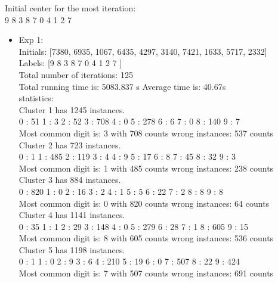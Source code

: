 \documentclass[paper=a4, fontsize=11pt]{scrartcl} %
\numberwithin{equation}{section} %
\numberwithin{figure}{section} %
\numberwithin{table}{section} %
\begin{document}
Initial center for the most iteration:\\
9 8 3 8 7 0 4 1 2 7  \\
\begin{itemize}
	\item Exp 1:  \\
	
	Initials: [7380, 6935, 1067, 6435, 4297, 3140, 7421, 1633, 5717, 2332] \\
	
	Labels: [9 8 3 8 7 0 4 1 2 7 ] \\
	
    Total number of iterations: 125 \\
    
    Total running time is: 5083.837 s Average time is: 40.67s \\
    
    statistics: \\
   Cluster 1 has 1245 instances.\\
0 : 51  1 : 3   2 : 52  3 : 708 4 : 0   5 : 278 6 : 6   7 : 0   8 : 140 9 : 7\\
Most common digit is: 3 with 708 counts wrong instances: 537 counts\\

Cluster 2 has 723 instances.\\
0 : 1   1 : 485 2 : 119 3 : 4   4 : 9   5 : 17  6 : 8   7 : 45  8 : 32  9 : 3\\
Most common digit is: 1 with 485 counts wrong instances: 238 counts\\

Cluster 3 has 884 instances.\\
0 : 820 1 : 0   2 : 16  3 : 2   4 : 1   5 : 5   6 : 22  7 : 2   8 : 8   9 : 8\\
Most common digit is: 0 with 820 counts wrong instances: 64 counts\\

Cluster 4 has 1141 instances.\\
0 : 35  1 : 1   2 : 29  3 : 148 4 : 0   5 : 279 6 : 28  7 : 1   8 : 605 9 : 15\\
Most common digit is: 8 with 605 counts wrong instances: 536 counts\\

Cluster 5 has 1198 instances.\\
0 : 1   1 : 0   2 : 9   3 : 6   4 : 210 5 : 19  6 : 0   7 : 507 8 : 22  9 : 424\\
Most common digit is: 7 with 507 counts wrong instances: 691 counts\\


\end{itemize}
\end{document}
